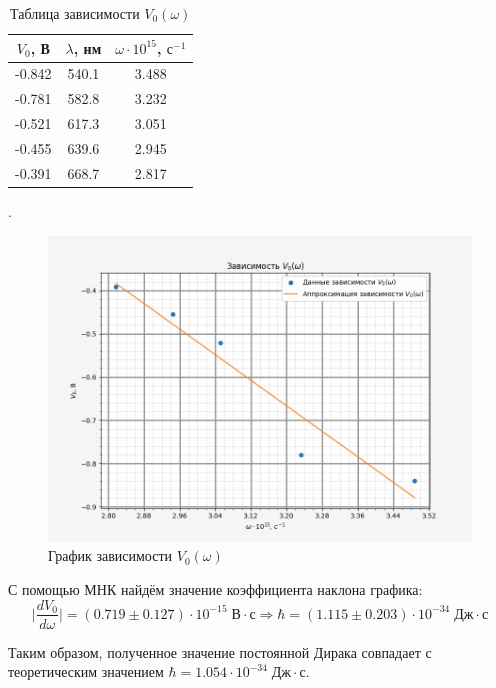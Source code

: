 \begin{enumerate}
        \begin{table}[H]
            \centering
            \begin{tabular}{|c|c|c|}
            \hline
            $V_0$, В & \multicolumn{1}{l|}{$\lambda$, нм} & \multicolumn{1}{l|}{$\omega \cdot 10^{15}$, $\text{с}^{-1}$} \\ \hline
            -0.842   & 540.1                              & 3.488                                                        \\ \hline
            -0.781   & 582.8                              & 3.232                                                        \\ \hline
            -0.521   & 617.3                              & 3.051                                                        \\ \hline
            -0.455   & 639.6                              & 2.945                                                        \\ \hline
            -0.391   & 668.7                              & 2.817                                                        \\ \hline
            \end{tabular}
            \caption{Таблица зависимости $V_0(\omega)$}.
        \end{table}

        \begin{figure}[H]
            \centering
            \includegraphics[width = 14.5 cm]{images/V_omega}
            \caption{График зависимости $V_0(\omega)$}
        \end{figure}

        С помощью МНК найдём значение коэффициента наклона графика:
        \begin{equation}
            \Bigg| \frac{dV_0}{d\omega} \Bigg| = (0.719 \pm 0.127) \cdot 10^{-15} \; \text{В} \cdot \text{с} \Rightarrow \hbar = (1.115 \pm 0.203) \cdot 10^{-34} \; \text{Дж} \cdot \text{с}
        \end{equation}

        Таким образом, полученное значение постоянной Дирака совпадает с теоретическим значением $\hbar = 1.054 \cdot 10^{-34} \; \text{Дж} \cdot \text{с}$.
        
    \end{enumerate}

